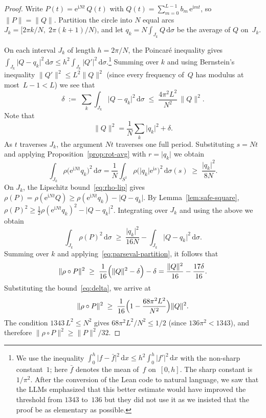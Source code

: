 \documentclass[11pt]{amsart}
\theoremstyle{remark}
\begin{document}
\begin{proof}
Write $P(t) = \mathrm{e}^{\mathrm{i} Nt}\,Q(t)$ with
$Q(t) = \sum_{m=0}^{L-1} b_m\,\mathrm{e}^{\mathrm{i} mt}$, so $\lVert P \rVert = \lVert Q \rVert$.
Partition the circle into $N$ equal arcs
$J_k = [2\pi k/N,\; 2\pi(k+1)/N)$, and let
$q_k = N\!\int_{J_k}\! Q\,\mathrm{d}\sigma$ be the average of $Q$ on~$J_k$.
\medskip

On each interval $J_k$ of length $h = 2\pi/N$, the Poincar\'e
inequality gives
$\int_{J_k}\lvert Q - q_k \rvert^2\,\mathrm{d}\sigma \le h^2\int_{J_k}\lvert Q' \rvert^2\,
\mathrm{d}\sigma$.\footnote{We use the inequality
$\int_0^h \lvert f - \bar f \rvert^2\,\mathrm{d} x
\le h^2\int_0^h\lvert f' \rvert^2\,\mathrm{d} x$
with the non-sharp constant~$1$; here $\bar f$ denotes the mean of~$f$
on~$[0,h]$.  The sharp 
constant is $1/\pi^2$. After the conversion of the Lean code to natural language, we saw that the LLMs emphasized that this better estimate would have improved the threshold from $1343$ to~$136$ but they did not use it as we insisted that the proof be as elementary as possible.}
Summing over $k$ and using Bernstein's inequality $\lVert Q' \rVert^2 \le L^2\lVert Q \rVert^2$
(since every frequency of~$Q$ has modulus at most~$L{-}1 < L$) we see that
\begin{equation}\label{eq:delta}
\delta \;:=\; \sum_{k} \int_{J_k}\lvert Q - q_k \rvert^2\,\mathrm{d}\sigma
\;\le\; \frac{4\pi^2 L^2}{N^2}\,\lVert Q \rVert^2.
\end{equation}
Note that
\begin{equation}\label{eq:parseval-partition}
\lVert Q \rVert^2
= \frac{1}{N}\sum_{k}\lvert q_k \rvert^2 + \delta.
\end{equation}
As $t$ traverses $J_k$, the argument $Nt$ traverses one full period.
Substituting $s = Nt$ and applying Proposition~\ref{prop:rot-avg} with
$r = \lvert q_k \rvert$ we obtain
\[
\int_{J_k}\rho\bigl(\mathrm{e}^{\mathrm{i} Nt} q_k\bigr)^2\,\mathrm{d}\sigma
= \frac{1}{N}\int_{S^1}\rho\bigl(\lvert q_k \rvert\mathrm{e}^{\mathrm{i} s}\bigr)^2\,\mathrm{d}\sigma(s)
\;\ge\; \frac{\lvert q_k \rvert^2}{8N}.
\]
On $J_k$, the Lipschitz bound~\eqref{eq:rho-lip} gives
$\rho(P) = \rho(\mathrm{e}^{\mathrm{i} Nt}Q)
\ge \rho(\mathrm{e}^{\mathrm{i} Nt}q_k) - \lvert Q - q_k \rvert$.
By Lemma~\ref{lem:safe-square},
$\rho(P)^2 \ge \tfrac{1}{2}\rho(\mathrm{e}^{\mathrm{i} Nt}q_k)^2 - \lvert Q - q_k \rvert^2$.
Integrating over $J_k$ and using the above we obtain
\[
\int_{J_k}\rho(P)^2\,\mathrm{d}\sigma
\;\ge\; \frac{\lvert q_k \rvert^2}{16N} - \int_{J_k}\lvert Q-q_k \rvert^2\,\mathrm{d}\sigma.
\]
Summing over $k$ and applying~\eqref{eq:parseval-partition}, it follows that
\[
\lVert \rho \circ P \rVert^2
\;\ge\; \frac{1}{16}\Bigl(\lVert Q \rVert^2 - \delta\Bigr) - \delta
= \frac{\lVert Q \rVert^2}{16} - \frac{17\delta}{16}.
\]
Substituting the bound~\eqref{eq:delta}, we arrive at
\[
\lVert \rho \circ P \rVert^2
\;\ge\;
\frac{1}{16}\Bigl(1 - \frac{68\pi^2 L^2}{N^2}\Bigr)\lVert Q \rVert^2.
\]
The condition $1343\,L^2 \le N^2$ gives $68\pi^2 L^2/N^2 \le 1/2$
(since $136\pi^2 < 1343$), and therefore
$\lVert \rho \circ P \rVert^2 \ge \lVert P \rVert^2/32$.
\end{proof}
\end{document}
